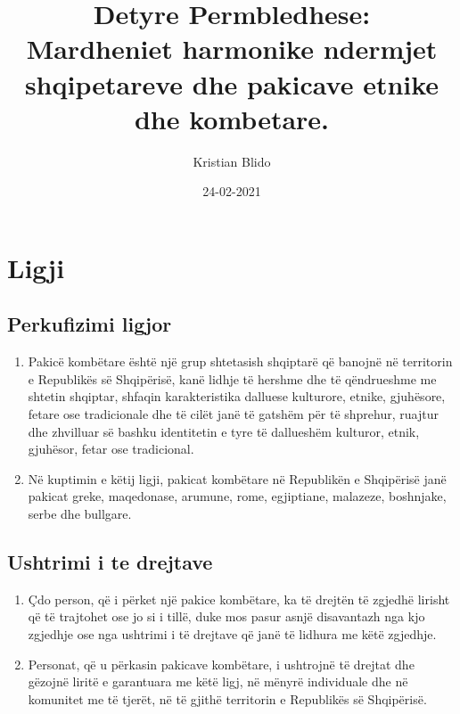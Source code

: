 \documentclass[a4paper]{article}
\title{\textbf{Detyre Permbledhese:} \\ Mardheniet harmonike ndermjet shqipetareve dhe pakicave etnike dhe kombetare.}
\author{Kristian Blido}
\date{24-02-2021}
\begin{document}
	\maketitle
	\section*{Ligji}
	\subsection*{Perkufizimi ligjor}
\begin{enumerate}
	\item Pakicë  kombëtare  është  një  grup  shtetasish  shqiptarë  që  banojnë në  territorin  e  Republikës  së  Shqipërisë,  kanë  lidhje  të  hershme  dhe  të  qëndrueshme  me  shtetin  shqiptar, shfaqin karakteristika dalluese kulturore, etnike, gjuhësore, fetare ose tradicionale dhe të cilët janë  të  gatshëm  për  të  shprehur,  ruajtur  dhe  zhvilluar  së  bashku  identitetin  e  tyre  të dallueshëm kulturor, etnik, gjuhësor, fetar ose tradicional.
	\item Në  kuptimin  e  këtij  ligji, pakicat  kombëtare  në  Republikën  e  Shqipërisë  janë  pakicat  greke, maqedonase, arumune, rome, egjiptiane, malazeze, boshnjake, serbe dhe bullgare.
\end{enumerate}
\subsection*{Ushtrimi i te drejtave}
\begin{enumerate}
	\item Çdo  person, që  i  përket  një  pakice  kombëtare,   ka  të  drejtën  të  zgjedhë  lirisht  që  të  trajtohet ose jo si i tillë,  duke mos pasur asnjë disavantazh nga kjo zgjedhje  ose nga ushtrimi i të drejtave që janë të lidhura me këtë zgjedhje.
	\item Personat,  që u  përkasin  pakicave  kombëtare,  i  ushtrojnë  të  drejtat  dhe gëzojnë liritë  e  garantuara  me  këtë  ligj,  në  mënyrë  individuale  dhe  në  komunitet  me  të  tjerët,   në  të  gjithë  territorin e Republikës së Shqipërisë.
\end{enumerate}
\end{document}
